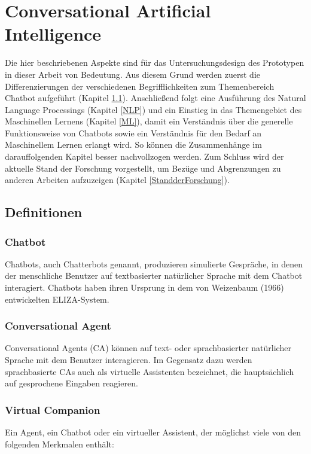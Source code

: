 \chapter{Conversational Artificial Intelligence}
    Die hier beschriebenen Aspekte sind für das Untersuchungsdesign des Prototypen 
    in dieser Arbeit von Bedeutung. Aus diesem Grund werden zuerst die Differenzierungen
    der verschiedenen Begrifflichkeiten zum Themenbereich Chatbot aufgeführt (Kapitel \ref{DEFChatbot}). Anschließend folgt eine
    Ausführung des Natural Language Processings (Kapitel \ref{NLP}) und ein Einstieg in das Themengebiet des Maschinellen Lernens (Kapitel \ref{ML}), damit 
    ein Verständnis über die generelle Funktionsweise von Chatbots sowie ein Verständnis für 
    den Bedarf an Maschinellem Lernen erlangt wird. So können die Zusammenhänge im darauffolgenden Kapitel besser nachvollzogen werden. 
    Zum Schluss wird der aktuelle Stand der Forschung vorgestellt, um Bezüge und Abgrenzungen zu anderen Arbeiten aufzuzeigen (Kapitel \ref{StandderForschung}). 

    \section{Definitionen} \label{DEFChatbot}

        \subsection{Chatbot} \label{Chatbot}
        Chatbots, auch Chatterbots genannt, produzieren simulierte Gespräche, 
        in denen der menschliche Benutzer auf textbasierter natürlicher Sprache mit dem Chatbot interagiert.
        Chatbots haben ihren Ursprung in dem von Weizenbaum (1966) entwickelten ELIZA-System. \nocite{Weizenbaum.1966} \parencite[57 f.]{McTear.2016} \parencite[2 ff.]{Gnewuch.2017}

        \subsection{Conversational Agent}
        Conversational Agents (CA) können auf text- oder sprachbasierter natürlicher Sprache mit dem 
        Benutzer interagieren. Im Gegensatz dazu werden sprachbasierte CAs auch als virtuelle Assistenten bezeichnet, 
        die hauptsächlich auf gesprochene Eingaben reagieren. \parencite[51 f.]{McTear.2016} \parencite[3]{Gnewuch.2017}
        
        \subsection{Virtual Companion}
        Ein Agent, ein Chatbot oder ein virtueller Assistent, der möglichst viele von den folgenden Merkmalen enthält: 

